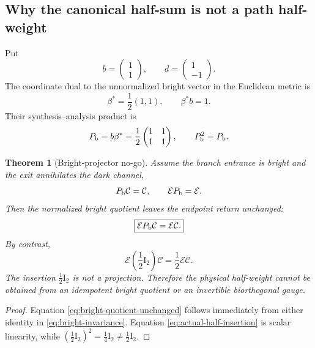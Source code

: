 \documentclass[11pt]{article}
\newtheorem{theorem}{Theorem}[section]
\theoremstyle{definition}
\theoremstyle{remark}
\newcommand{\Id}{\mathrm I}
\newcommand{\cC}{\mathcal C}
\newcommand{\cE}{\mathcal E}
\begin{document}
\subsection{Why the canonical half-sum is not a path half-weight}

Put
\begin{equation}\label{eq:bright-dark-vectors}
 b=\begin{pmatrix}1\\1\end{pmatrix},
 \qquad
 d=\begin{pmatrix}1\\-1\end{pmatrix}.
\end{equation}
The coordinate dual to the unnormalized bright vector in the Euclidean
metric is
\begin{equation}\label{eq:bright-dual}
 \beta^*=\frac12(1,1),
 \qquad
 \beta^*b=1.
\end{equation}
Their synthesis--analysis product is
\begin{equation}\label{eq:bright-projector}
 P_{\rm b}=b\beta^*
 =\frac12\begin{pmatrix}1&1\\1&1\end{pmatrix},
 \qquad
 P_{\rm b}^2=P_{\rm b}.
\end{equation}

\begin{theorem}[Bright-projector no-go]
\label{thm:half-no-go}
Assume the branch entrance is bright and the exit annihilates the dark
channel,
\begin{equation}\label{eq:bright-invariance}
 P_{\rm b}\cC=\cC,
 \qquad
 \cE P_{\rm b}=\cE.
\end{equation}
Then the normalized bright quotient leaves the endpoint return unchanged:
\begin{equation}\label{eq:bright-quotient-unchanged}
 \boxed{\cE P_{\rm b}\cC=\cE\cC.}
\end{equation}
By contrast,
\begin{equation}\label{eq:actual-half-insertion}
 \cE\left(\frac12\Id_2\right)\cC
 =\frac12\cE\cC.
\end{equation}
The insertion $\frac12\Id_2$ is not a projection.  Therefore the physical
half-weight cannot be obtained from an idempotent bright quotient or an
invertible biorthogonal gauge.
\end{theorem}

\begin{proof}
Equation \eqref{eq:bright-quotient-unchanged} follows immediately from either
identity in \eqref{eq:bright-invariance}.  Equation
\eqref{eq:actual-half-insertion} is scalar linearity, while
$(\frac12\Id_2)^2=\frac14\Id_2\ne\frac12\Id_2$.
\end{proof}
\end{document}
